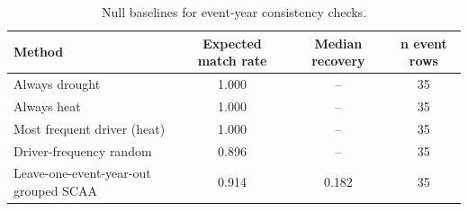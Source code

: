 \begin{table}[!htbp]
\centering
\caption{Null baselines for event-year consistency checks.}
\label{tab:event_null_baselines}
\small
\renewcommand{\arraystretch}{1.12}
\begin{tabular*}{\linewidth}{@{\extracolsep{\fill}}lccc@{}}
\toprule
Method & Expected match rate & Median recovery & n event rows \\
\midrule
Always drought & 1.000 & -- & 35 \\
Always heat & 1.000 & -- & 35 \\
Most frequent driver (heat) & 1.000 & -- & 35 \\
Driver-frequency random & 0.896 & -- & 35 \\
Leave-one-event-year-out grouped SCAA & 0.914 & 0.182 & 35 \\
\bottomrule
\end{tabular*}
\end{table}
